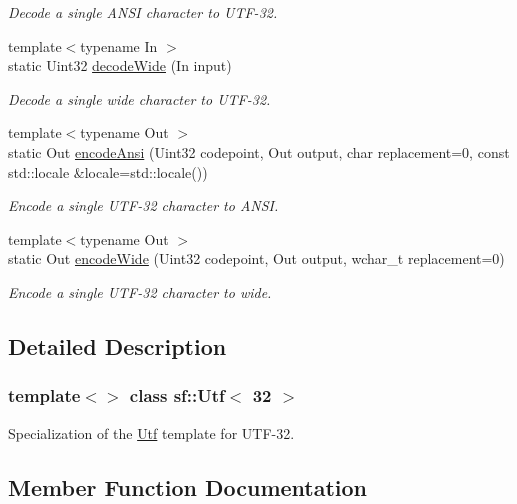 \begin{DoxyCompactItemize}
\begin{DoxyCompactList}\small\item\em Decode a single A\+N\+SI character to U\+T\+F-\/32. \end{DoxyCompactList}\item 
{\footnotesize template$<$typename In $>$ }\\static Uint32 \hyperlink{classsf_1_1_utf_3_0132_01_4_a043fe25f5f4dbc205e78e6f1d99840dc}{decode\+Wide} (In input)
\begin{DoxyCompactList}\small\item\em Decode a single wide character to U\+T\+F-\/32. \end{DoxyCompactList}\item 
{\footnotesize template$<$typename Out $>$ }\\static Out \hyperlink{classsf_1_1_utf_3_0132_01_4_af6590226a071076ca22d818573a16ded}{encode\+Ansi} (Uint32 codepoint, Out output, char replacement=0, const std\+::locale \&locale=std\+::locale())
\begin{DoxyCompactList}\small\item\em Encode a single U\+T\+F-\/32 character to A\+N\+SI. \end{DoxyCompactList}\item 
{\footnotesize template$<$typename Out $>$ }\\static Out \hyperlink{classsf_1_1_utf_3_0132_01_4_a52e511e74ddc5df1bbf18f910193bc47}{encode\+Wide} (Uint32 codepoint, Out output, wchar\+\_\+t replacement=0)
\begin{DoxyCompactList}\small\item\em Encode a single U\+T\+F-\/32 character to wide. \end{DoxyCompactList}\end{DoxyCompactItemize}


\subsection{Detailed Description}
\subsubsection*{template$<$$>$\newline
class sf\+::\+Utf$<$ 32 $>$}

Specialization of the \hyperlink{classsf_1_1_utf}{Utf} template for U\+T\+F-\/32. 

\subsection{Member Function Documentation}
\mbox{\label{classsf_1_1_utf_3_0132_01_4_a9b18c32b9e6d4b3126e9b4af45988b55}} 
